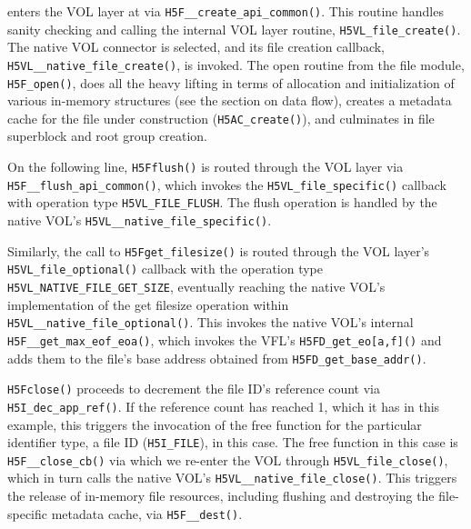  enters the VOL layer at  via \texttt{H5F\_\_create\_api\_common()}. This routine handles sanity checking and calling the internal VOL layer routine, \texttt{H5VL\_file\_create()}. The native VOL connector is selected, and its file creation callback, \texttt{H5VL\_\_native\_file\_create()}, is invoked. The open routine from the file module, \texttt{H5F\_open()}, does all the heavy lifting in terms of allocation and initialization of various in-memory structures (see the section on data flow), creates a metadata cache for the file under construction (\texttt{H5AC\_create()}), and culminates in file superblock and root group creation.

On the following line, \texttt{H5Fflush()} is routed through the VOL layer via \texttt{H5F\_\_flush\_api\_common()}, which invokes the \texttt{H5VL\_file\_specific()} callback with operation type \texttt{H5VL\_FILE\_FLUSH}. The flush operation is handled by the native VOL's \texttt{H5VL\_\_native\_file\_specific()}.

Similarly, the call to \texttt{H5Fget\_filesize()} is routed through the VOL layer's \texttt{H5VL\_file\_optional()} callback with the operation type \texttt{H5VL\_NATIVE\_FILE\_GET\_SIZE}, eventually reaching the native VOL's implementation of the get filesize operation within \texttt{H5VL\_\_native\_file\_optional()}. This invokes the native VOL's internal \texttt{H5F\_\_get\_max\_eof\_eoa()}, which invokes the VFL's \texttt{H5FD\_get\_eo[a,f]()} and adds them to the file's base address obtained from \texttt{H5FD\_get\_base\_addr()}.

\texttt{H5Fclose()} proceeds to decrement the file ID's reference count via \texttt{H5I\_dec\_app\_ref()}. If the reference count has reached 1, which it has in this example, this triggers the invocation of the free function for the particular identifier type, a file ID (\texttt{H5I\_FILE}), in this case. The free function in this case is \texttt{H5F\_\_close\_cb()} via which we re-enter the VOL through \texttt{H5VL\_file\_close()}, which in turn calls the native VOL's \texttt{H5VL\_\_native\_file\_close()}. This triggers the release of in-memory file resources, including flushing and destroying the file-specific metadata cache, via \texttt{H5F\_\_dest()}.

